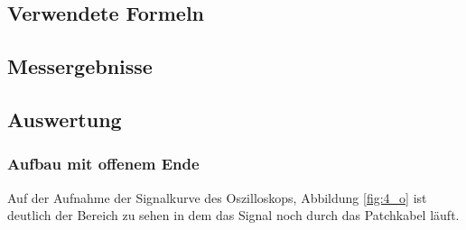 \documentclass[12pt,a4paper]{article}
\begin{document}
\subsection{Verwendete Formeln}
\subsection{Messergebnisse}
\subsection{Auswertung}

\subsubsection{Aufbau mit offenem Ende}

Auf der Aufnahme der Signalkurve des Oszilloskops, Abbildung \ref{fig:4_o} ist deutlich der Bereich zu sehen in dem das Signal noch durch das Patchkabel läuft.
\end{document}

